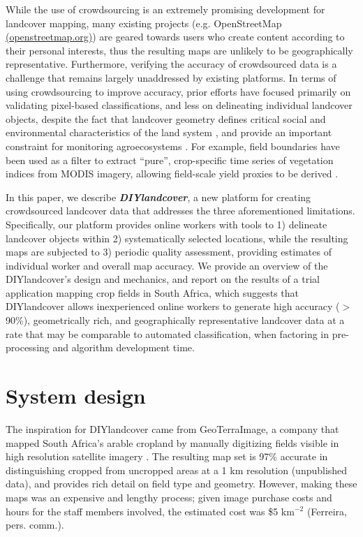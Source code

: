 \documentclass[preprint,12pt,authoryear]{elsarticle}
\begin{document}
While the use of crowdsourcing is an extremely promising development for landcover mapping, many existing projects   (e.g. OpenStreetMap \href{openstreetmap.org}{(openstreetmap.org)}) are geared towards users who create content according to their personal interests, thus the resulting maps are unlikely to be geographically representative. Furthermore, verifying the accuracy of crowdsourced data is a challenge \citep{allahbakhsh_quality_2013, flanagin_credibility_2008, see_improved_2015} that remains largely unaddressed by existing platforms. In terms of using crowdsourcing to improve accuracy, prior efforts have focused primarily on validating pixel-based classifications, and less on delineating individual landcover objects, despite the fact that landcover geometry defines critical social and environmental characteristics of the land system \citep{fritz_mapping_2015}, and provide an important constraint for monitoring agroecosystems \citep[e.g][]{estes_projected_2013, estes_comparing_2013}. For example, field boundaries have been used as a filter to extract ``pure'', crop-specific time series of vegetation indices from MODIS imagery, allowing field-scale yield proxies to be derived \citep{estes_projected_2013, estes_comparing_2013}.  

In this paper, we describe \emph{\textbf{DIYlandcover}}, a new platform for creating crowdsourced landcover data that addresses the three aforementioned limitations. Specifically, our platform provides online workers with tools to 1) delineate landcover objects within 2) systematically selected locations, while the resulting maps are subjected to 3) periodic quality assessment, providing estimates of individual worker and overall map accuracy. We provide an overview of the DIYlandcover's design and mechanics, and report on the results of a trial application mapping crop fields in South Africa, which suggests that DIYlandcover allows inexperienced online workers to generate high accuracy ($>$90\%), geometrically rich, and geographically representative landcover data at a rate that may be  comparable to automated classification, when factoring in pre-processing and algorithm development time. 

\section{System design}
The inspiration for DIYlandcover came from GeoTerraImage, a company that mapped South Africa's arable cropland by manually digitizing fields visible in high resolution satellite imagery  \citep{geoterraimage_south_2008}. The resulting map set is 97\% accurate in distinguishing cropped from uncropped areas at a 1 km resolution (unpublished data), and provides rich detail on field type and geometry. However, making these maps was an expensive and lengthy process; given image purchase costs and hours for the staff members involved, the estimated cost was \$5 km$^{-2}$ (Ferreira, pers. comm.). 
\end{document}
